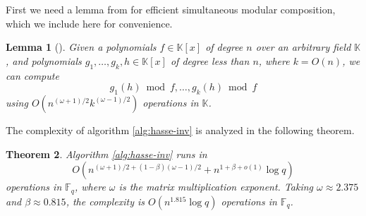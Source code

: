 \documentclass[12pt]{article}
\theoremstyle{plain}
\newtheorem{theorem}{Theorem}
\newtheorem{lemma}[theorem]{Lemma}
\theoremstyle{definition}
\def\F{\ensuremath{\mathbb{F}}}
\def\K{\ensuremath{\mathbb{K}}}
\begin{document}
First we need a lemma from \cite{ks} for efficient simultaneous modular composition, which we 
include here for convenience.
\begin{lemma}[\cite{ks}]
	\label{lemma:ks}
	Given a polynomials $f \in \K[x]$ of degree $n$ over an arbitrary field $\K$, and polynomials 
	$g_1, \dots, g_k, h \in \K[x]$ of degree less than $n$, where $k = O(n)$, we can compute 
	\[ g_1(h) \bmod f, \dots, g_k(h) \bmod f \]
	using $O(n^{(\omega + 1) / 2} k^{(\omega - 1) / 2})$ operations in $\K$.
\end{lemma}
The complexity of algorithm \ref{alg:hasse-inv} is analyzed in the following theorem.
\begin{theorem}
	\label{theo:hasse-inv}
	Algorithm \ref{alg:hasse-inv} runs in
	\[O(n^{(\omega + 1) / 2 + (1 - \beta)(\omega - 1) / 2} + n^{1 + \beta + o(1)}\log q)\] 
	operations in $\F_q$, where $\omega$ is the matrix multiplication exponent. Taking $\omega 
	\approx	2.375$ and $\beta \approx 0.815$, the complexity is $O(n^{1.815}\log q)$ operations in 
	$\F_q$.
\end{theorem}
\end{document}
